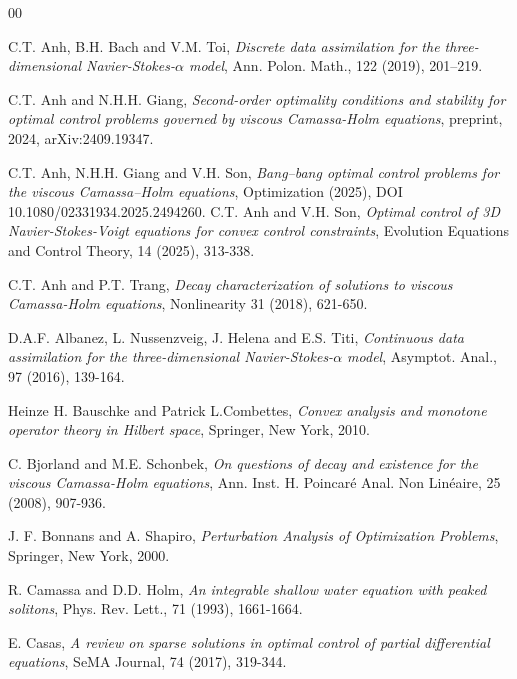 \documentclass[reqno]{amsart}
\begin{document}
	\begin{thebibliography}{00}
		
		 C.T.  Anh, B.H.  Bach and V.M. Toi, \textit{Discrete data assimilation for the three-dimensional Navier-Stokes-$\alpha$ model}, Ann. Polon. Math., 122 (2019),  201–219.
		
		 C.T.  Anh and N.H.H.  Giang, \textit{Second-order optimality conditions and stability for optimal control problems governed by viscous Camassa-Holm equations}, preprint, 2024, 	arXiv:2409.19347.
		
		 C.T.  Anh, N.H.H.  Giang and V.H. Son, \textit{Bang–bang optimal control problems for the viscous Camassa–Holm equations}, Optimization (2025),  DOI 10.1080/02331934.2025.2494260.
		 C.T.  Anh and V.H. Son, \textit{Optimal control of 3D Navier-Stokes-Voigt equations for convex control constraints}, Evolution Equations and Control Theory, 14 (2025), 313-338.
		
		 C.T. Anh and P.T. Trang, \textit{Decay characterization of solutions to viscous Camassa-Holm equations},  Nonlinearity 31 (2018),  621-650.
		
		 D.A.F. Albanez, L. Nussenzveig, J. Helena and E.S. Titi, \textit{Continuous data assimilation for the three-dimensional Navier-Stokes-$\alpha$ model}, Asymptot. Anal., 97 (2016), 139-164.
		
		 Heinze H. Bauschke and Patrick L.Combettes, {\it Convex analysis and monotone operator theory in Hilbert space}, Springer, New York, 2010.
		
		 C. Bjorland and M.E. Schonbek, \textit{On questions of decay and existence for the viscous Camassa-Holm equations}, Ann. Inst. H. Poincar\'e Anal. Non Lin\'eaire, 25 (2008), 907-936.
		
		
		 J. F. Bonnans and A. Shapiro, \textit{Perturbation Analysis of Optimization Problems}, Springer, New York, 2000.
		
		 R. Camassa and D.D. Holm, \textit{An integrable shallow water equation with peaked solitons}, Phys. Rev. Lett., 71 (1993), 1661-1664.
		
		 E. Casas, \textit{A review on sparse solutions in optimal control of partial differential equations}, SeMA Journal, 74 (2017), 319-344.
		

\end{thebibliography}
\end{document}
